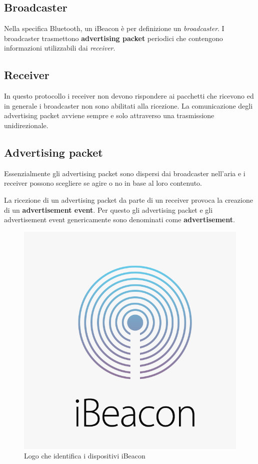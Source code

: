 \subsection{Broadcaster}
Nella specifica Bluetooth, un iBeacon è per definizione un \textit{broadcaster}. I broadcaster trasmettono \textbf{advertising packet} periodici che contengono informazioni utilizzabili dai \textit{receiver}. 

\subsection{Receiver}
In questo protocollo i receiver non devono rispondere ai pacchetti che ricevono ed in generale i broadcaster non sono abilitati alla ricezione. La comunicazione degli advertising packet avviene sempre e solo attraverso una trasmissione unidirezionale.

\subsection{Advertising packet}
Essenzialmente gli advertising packet sono dispersi dai broadcaster nell'aria e i receiver possono scegliere se agire o no in base al loro contenuto.

La ricezione di un advertising packet da parte di un receiver provoca la creazione di un \textbf{advertisement event}. Per questo gli advertising packet e gli advertisement event genericamente sono denominati come \textbf{advertisement}. 

\begin{figure}[!ht]
	\centering
	\includegraphics[scale=.20]{img/bt/ibeacon.png}
	\caption{Logo che identifica i dispositivi iBeacon}
\end{figure}

